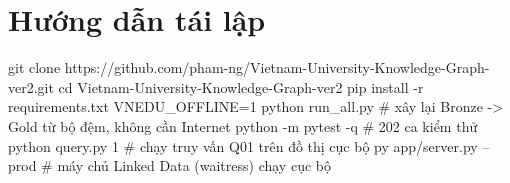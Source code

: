 \documentclass[12pt,a4paper]{article}
\begin{document}
\section{Hướng dẫn tái lập}\label{app:repro}
\begin{code}
git clone https://github.com/pham-ng/Vietnam-University-Knowledge-Graph-ver2.git
cd Vietnam-University-Knowledge-Graph-ver2
pip install -r requirements.txt
VNEDU_OFFLINE=1 python run_all.py        # xây lại Bronze -> Gold từ bộ đệm, không cần Internet
python -m pytest -q                      # 202 ca kiểm thử
python query.py 1                        # chạy truy vấn Q01 trên đồ thị cục bộ
py app/server.py --prod                  # máy chủ Linked Data (waitress) chạy cục bộ
\end{code}
\end{document}
